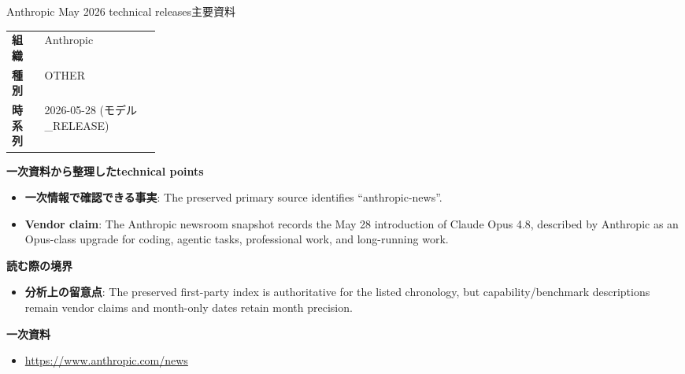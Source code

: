\begin{technicalnote}{Anthropic May 2026 technical releases}{主要資料}
\begin{tabularx}{\linewidth}{@{}>{\bfseries}p{0.22\linewidth}X@{}}
組織 & Anthropic \\
種別 & OTHER \\
時系列 & 2026-05-28 (モデル\_RELEASE) \\
\end{tabularx}
\smallskip
{\bfseries 一次資料から整理したtechnical points}
\begin{itemize}[leftmargin=1.5em,itemsep=0.35em]
\item \textbf{一次情報で確認できる事実}: The preserved primary source identifies “anthropic-news”.
\item \textbf{Vendor claim}: The Anthropic newsroom snapshot records the May 28 introduction of Claude Opus 4.8, described by Anthropic as an Opus-class upgrade for coding, agentic tasks, professional work, and long-running work.
\end{itemize}
{\bfseries 読む際の境界}
\begin{itemize}[leftmargin=1.5em,itemsep=0.35em]
\item \textbf{分析上の留意点}: The preserved first-party index is authoritative for the listed chronology, but capability/benchmark descriptions remain vendor claims and month-only dates retain month precision.
\end{itemize}
{\bfseries 一次資料}
\begingroup\sloppy
\begin{itemize}[leftmargin=1.5em,itemsep=0.25em]
\item {\scriptsize\url{https://www.anthropic.com/news}}
\end{itemize}
\endgroup
\end{technicalnote}
\medskip

